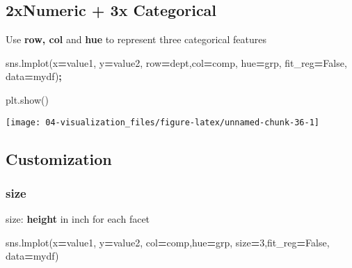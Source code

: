 \documentclass[
]{book}
\newenvironment{Shaded}{\begin{snugshade}}{\end{snugshade}}
\newcommand{\DecValTok}[1]{\textcolor[rgb]{0.06,0.06,0.06}{#1}}
\newcommand{\NormalTok}[1]{#1}
\newcommand{\OperatorTok}[1]{\textcolor[rgb]{0.43,0.43,0.43}{\textbf{#1}}}
\newcommand{\StringTok}[1]{\textcolor[rgb]{0.5,0.5,0.5}{#1}}
\newcommand{\VariableTok}[1]{\textcolor[rgb]{0,0,0}{#1}}
\begin{document}
\hypertarget{xnumeric-3x-categorical}{%
\subsection{2xNumeric + 3x Categorical}\label{xnumeric-3x-categorical}}

Use \textbf{row, col} and \textbf{hue} to represent three categorical features

\begin{Shaded}
\begin{Highlighting}[]
\NormalTok{sns.lmplot(x}\OperatorTok{=}\StringTok{\textquotesingle{}value1\textquotesingle{}}\NormalTok{, y}\OperatorTok{=}\StringTok{\textquotesingle{}value2\textquotesingle{}}\NormalTok{, row}\OperatorTok{=}\StringTok{\textquotesingle{}dept\textquotesingle{}}\NormalTok{,col}\OperatorTok{=}\StringTok{\textquotesingle{}comp\textquotesingle{}}\NormalTok{, hue}\OperatorTok{=}\StringTok{\textquotesingle{}grp\textquotesingle{}}\NormalTok{, fit\_reg}\OperatorTok{=}\VariableTok{False}\NormalTok{, data}\OperatorTok{=}\NormalTok{mydf)}\OperatorTok{;}
\end{Highlighting}
\end{Shaded}

\begin{Shaded}
\begin{Highlighting}[]
\NormalTok{plt.show()}
\end{Highlighting}
\end{Shaded}

\texttt{[image: 04-visualization\_files/figure-latex/unnamed-chunk-36-1]}

\hypertarget{customization}{%
\subsection{Customization}\label{customization}}

\hypertarget{size}{%
\subsubsection{size}\label{size}}

size: \textbf{height} in inch for each facet

\begin{Shaded}
\begin{Highlighting}[]
\NormalTok{sns.lmplot(x}\OperatorTok{=}\StringTok{\textquotesingle{}value1\textquotesingle{}}\NormalTok{, y}\OperatorTok{=}\StringTok{\textquotesingle{}value2\textquotesingle{}}\NormalTok{, col}\OperatorTok{=}\StringTok{\textquotesingle{}comp\textquotesingle{}}\NormalTok{,hue}\OperatorTok{=}\StringTok{\textquotesingle{}grp\textquotesingle{}}\NormalTok{, size}\OperatorTok{=}\DecValTok{3}\NormalTok{,fit\_reg}\OperatorTok{=}\VariableTok{False}\NormalTok{, data}\OperatorTok{=}\NormalTok{mydf)}
\end{Highlighting}
\end{Shaded}
\end{document}
